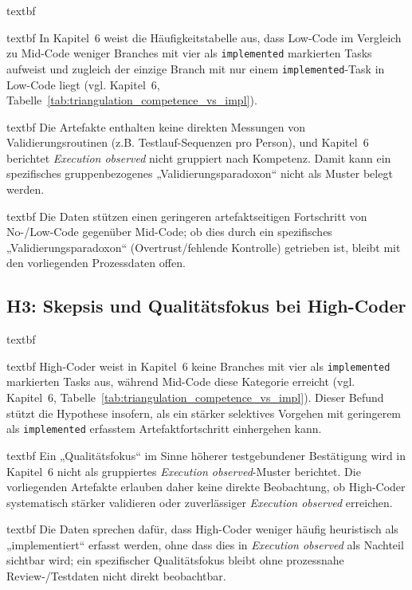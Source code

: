 	\csname textbf

	\csname textbf In Kapitel~6 weist die Häufigkeitstabelle aus, dass Low-Code im Vergleich zu Mid-Code weniger Branches mit vier als \texttt{implemented} markierten Tasks aufweist und zugleich der einzige Branch mit nur einem \texttt{implemented}-Task in Low-Code liegt (vgl. Kapitel~6, Tabelle~\ref{tab:triangulation_competence_vs_impl}).

	\csname textbf Die Artefakte enthalten keine direkten Messungen von Validierungsroutinen (z.B. Testlauf-Sequenzen pro Person), und Kapitel~6 berichtet \textit{Execution observed} nicht gruppiert nach Kompetenz. Damit kann ein spezifisches gruppenbezogenes „Validierungsparadoxon“ nicht als Muster belegt werden.

	\csname textbf Die Daten stützen einen geringeren artefaktseitigen Fortschritt von No-/Low-Code gegenüber Mid-Code; ob dies durch ein spezifisches „Validierungsparadoxon“ (Overtrust/fehlende Kontrolle) getrieben ist, bleibt mit den vorliegenden Prozessdaten offen.

\subsection{H3: Skepsis und Qualitätsfokus bei High-Coder}
\label{sec:discussion_h3}

	\csname textbf

	\csname textbf High-Coder weist in Kapitel~6 keine Branches mit vier als \texttt{implemented} markierten Tasks aus, während Mid-Code diese Kategorie erreicht (vgl. Kapitel~6, Tabelle~\ref{tab:triangulation_competence_vs_impl}). Dieser Befund stützt die Hypothese insofern, als ein stärker selektives Vorgehen mit geringerem als \texttt{implemented} erfasstem Artefaktfortschritt einhergehen kann.

	\csname textbf Ein „Qualitätsfokus“ im Sinne höherer testgebundener Bestätigung wird in Kapitel~6 nicht als gruppiertes \textit{Execution observed}-Muster berichtet. Die vorliegenden Artefakte erlauben daher keine direkte Beobachtung, ob High-Coder systematisch stärker validieren oder zuverlässiger \textit{Execution observed} erreichen.

	\csname textbf Die Daten sprechen dafür, dass High-Coder weniger häufig heuristisch als „implementiert“ erfasst werden, ohne dass dies in  \textit{Execution observed} als Nachteil sichtbar wird; ein spezifischer Qualitätsfokus bleibt ohne prozessnahe Review-/Testdaten nicht direkt beobachtbar.

